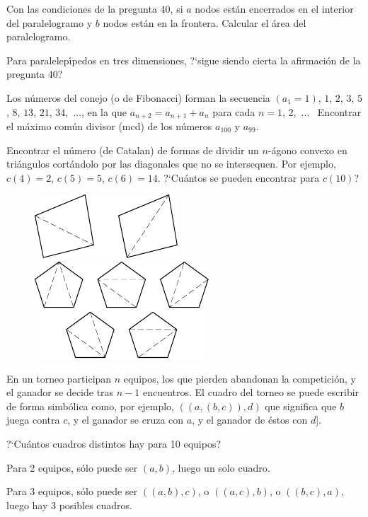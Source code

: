 \documentclass[12pt]{article}  %
\begin{document}
\medskip
{} Con las condiciones de la pregunta 40, si $a$ nodos est\'an encerrados en el interior del paralelogramo y $b$ nodos est\'an en la frontera. Calcular el \'area del paralelogramo. 

\bigskip
{} Para paralelep\'{\i}pedos en tres dimensiones, ?`sigue siendo cierta la afirmaci\'on de la pregunta 40?

\bigskip
{} Los n\'umeros del conejo (o de Fibonacci) forman la secuencia $(a_1=1)$, $1$, $2$, $3$, $5$, $8$, $13$, $21$,
$34$,\nobreak\ $\dots$, en la que $a_{n+2}=a_{n+1}+a_n$ para cada
$n=1$, $2$,\nobreak\ $\dots$ \   Encontrar el m\'aximo com\'un divisor (mcd) de los n\'umeros $a_{100}$ y $a_{99}$.


 Encontrar el n\'umero (de Catalan) de formas de dividir un $n$-\'agono convexo en tri\'angulos cort\'andolo por las diagonales que no se intersequen. 
Por ejemplo, $c(4)=2$, $c(5)=5$, $c(6)=14$. ?`Cu\'antos se pueden encontrar para $c(10)$?
\begin{figure}[h]
\centering
\includegraphics[scale=1]{taskbook-281}
\hskip1cm\includegraphics[scale=1]{taskbook-282}
\end{figure}


\bigskip
{} En un torneo participan $n$ equipos, los que pierden abandonan la competici\'on, y el ganador se decide tras $n-1$ encuentros.
El cuadro del torneo se puede escribir de forma simb\'olica como, por ejemplo,  $((a,(b,c)),d)$ que significa que $b$ juega contra $c$, y el ganador se cruza con $a$, y el ganador de \'estos con $d$].

?`Cu\'antos cuadros distintos hay para 10 equipos? 

Para 2 equipos, s\'olo puede ser $(a,b)$, luego un solo cuadro.

Para 3 equipos, s\'olo puede ser $((a,b),c)$, o $((a,c),b)$, o $((b,c),a)$, luego hay 3 posibles cuadros.
\end{document}
